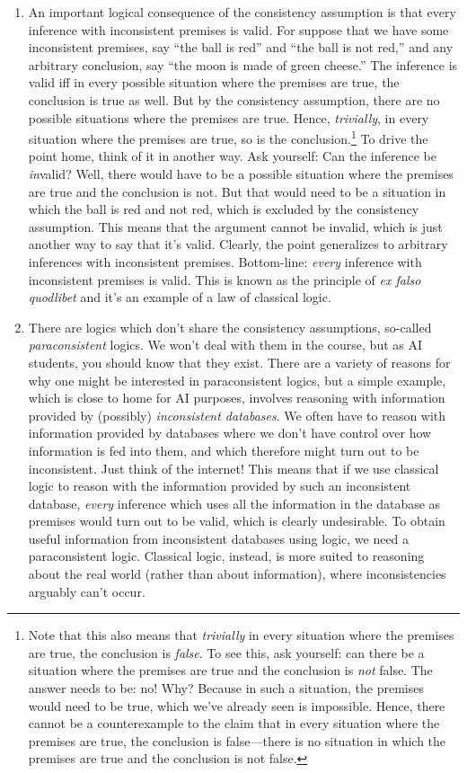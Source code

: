 \begin{enumerate}[\thesection.1]
	\item An important logical consequence of the consistency assumption is that every inference with inconsistent premises is valid. For suppose that we have some inconsistent premises, say ``the ball is red'' and ``the ball is not red,'' and any arbitrary conclusion, say ``the moon is made of green cheese.'' The inference is valid iff in every possible situation where the premises are true, the conclusion is true as well. But by the consistency assumption, there are no possible situations where the premises are true. Hence, \emph{trivially}, in every situation where the premises are true, so is the conclusion.\footnote{Note that this also means that \emph{trivially} in every situation where the premises are true, the conclusion is \emph{false}. To see this, ask yourself: can there be a situation where the premises are true and the conclusion is \emph{not} false. The answer needs to be: no! Why? Because in such a situation, the premises would need to be true, which we've already seen is impossible. Hence, there cannot be a counterexample to the claim that in every situation where the premises are true, the conclusion is false---there is no situation in which the premises are true and the conclusion is not false. } To drive the point home, think of it in another way. Ask yourself: Can the inference be \emph{in}valid? Well, there would have to be a possible situation where the premises are true and the conclusion is not. But that would need to be a situation in which the ball is red and not red, which is excluded by the consistency assumption. This means that the argument cannot be invalid, which is just another way to say that it's valid. Clearly, the point generalizes to arbitrary inferences with inconsistent premises. Bottom-line: \emph{every} inference with inconsistent premises is valid. This is known as the principle of \emph{ex falso quodlibet} and it's  an example of a law of classical logic.
	
	\item There are logics which don't share the consistency assumptions, so-called \emph{paraconsistent} logics. We won't deal with them in the course, but as AI students, you should know that they exist. There are a variety of reasons for why one might be interested in paraconsistent logics, but a simple example, which is close to home for AI purposes, involves reasoning with information provided by (possibly) \emph{inconsistent databases}. We often have to reason with information provided by databases where we don't have control over how information is fed into them, and which therefore might turn out to be inconsistent. Just think of the internet! This means that if we use classical logic to reason with the information provided by such an inconsistent database, \emph{every} inference which uses all the information in the database as premises would turn out to be valid, which is clearly undesirable. To obtain useful information from inconsistent databases using logic, we need a paraconsistent logic. Classical logic, instead, is more suited to reasoning about the real world (rather than about information), where inconsistencies arguably can't occur.
	

\end{enumerate}
